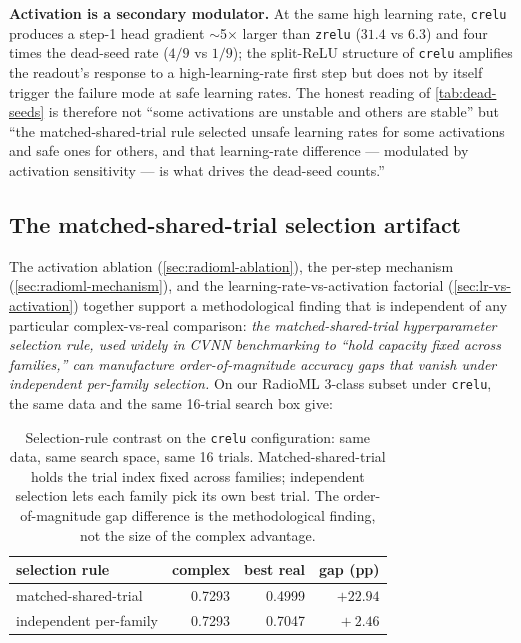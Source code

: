 \documentclass{article}
\providecommand{\Cref}[1]{\autoref{#1}}
\newcommand{\code}[1]{\texttt{#1}}
\begin{document}
\textbf{Activation is a secondary modulator.} At the same high learning rate,
\code{crelu} produces a step-1 head gradient $\sim$5$\times$ larger
than \code{zrelu} ($31.4$ vs $6.3$) and four times the dead-seed rate
($4/9$ vs $1/9$); the split-ReLU structure of \code{crelu} amplifies
the readout's response to a high-learning-rate first step but does not by itself
trigger the failure mode at safe learning rates. The honest reading
of \Cref{tab:dead-seeds} is therefore not ``some activations are
unstable and others are stable'' but ``the matched-shared-trial rule
selected unsafe learning rates for some activations and safe ones
for others, and that learning-rate difference --- modulated by activation
sensitivity --- is what drives the dead-seed counts.''

\subsection{The matched-shared-trial selection artifact}
\label{sec:selection-rules}

The activation ablation (\Cref{sec:radioml-ablation}), the per-step
mechanism (\Cref{sec:radioml-mechanism}), and the
learning-rate-vs-activation factorial (\Cref{sec:lr-vs-activation})
together support a methodological finding that is independent of any
particular complex-vs-real comparison: \emph{the matched-shared-trial
hyperparameter selection rule, used widely in CVNN benchmarking to
``hold capacity fixed across families,'' can manufacture
order-of-magnitude accuracy gaps that vanish under independent
per-family selection.} On our RadioML 3-class subset under
\code{crelu}, the same data and the same 16-trial search box give:

\begin{table}[t]
  \centering
  \caption{Selection-rule contrast on the \code{crelu} configuration:
    same data, same search space, same 16 trials. Matched-shared-trial
    holds the trial index fixed across families; independent selection
    lets each family pick its own best trial. The order-of-magnitude
    gap difference is the methodological finding, not the size of the
    complex advantage.}
  \label{tab:selection-rule-contrast}
  \begin{tabular}{lrrr}
    \toprule
    selection rule & complex & best real & gap (pp) \\
    \midrule
    matched-shared-trial   & 0.7293 & 0.4999 & $+22.94$ \\
    independent per-family & 0.7293 & 0.7047 & $\phantom{+0}+2.46$ \\
    \bottomrule
  \end{tabular}
\end{table}
\end{document}
